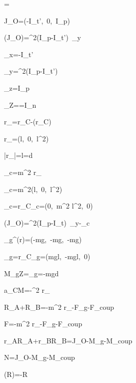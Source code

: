 \vec{\omega}=\omega{}

J_O\vec{\omega}=\omega\left(-I_t'\sin\beta,\ 0,\ I_p\cos\beta\right)

\vec{\omega}\times\left(J_O\vec{\omega}\right)=\omega^2\left(I_p-I_t'\right)\sin\beta\cos\beta\ _y

\tau_x=-I_t'\dot{\omega}\sin\beta

\tau_y=\omega^2\left(I_p-I_t'\right)\sin\beta\cos\beta

\tau_z=I_p\dot{\omega}\cos\beta

\tau_Z=\cdot\vec{\tau}=I_n\dot{\omega}

r_{\perp}=r_C-\left(r_C\cdot{}\right)

r_{\perp}=\left(l\sin\beta\cos\beta,\ 0,\ l\sin^2\beta\right)

\left|r_{\perp}\right|=l\sin\beta=d

_c=m\omega^2 r_{\perp}

_c=m\omega^2\left(l\sin\beta\cos\beta,\ 0,\ l\sin^2\beta\right)

_c=r_C\times{}_c=\left(0,\ m\omega^2 l^2\sin\beta\cos\beta,\ 0\right)

\vec{\omega}\times\left(J_O\vec{\omega}\right)=\omega^2\left(I_p-I_t\right)\sin\beta\cos\beta\ _y-_c

_g^{(r)}=\left(-mg\cos\beta\sin\theta,\ -mg\cos\theta,\ -mg\sin\beta\sin\theta\right)

_g=r_C\times{}_g=\left(mgl\cos\theta,\ -mgl\cos\beta\sin\theta,\ 0\right)

M_{gZ}=\cdot{}_g=-mgd\cos\theta

a_{CM}=-\omega^2 r_{\perp}

R_A+R_B=-m\omega^2 r_{\perp}-F_g-F_{coup}

F=-m\omega^2 r_{\perp}-F_g-F_{coup}

r_A\times R_A+r_B\times R_B=\vec{\omega}\times J_O\vec{\omega}-M_g-M_{coup}

N=\vec{\omega}\times J_O\vec{\omega}-M_g-M_{coup}

\times\left(\times R\right)=-R

